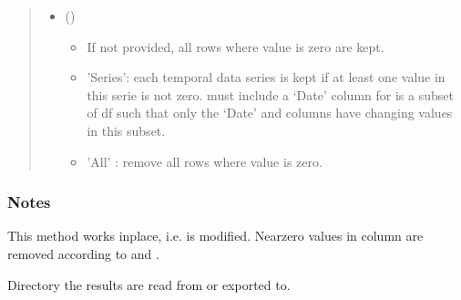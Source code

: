\documentclass[letterpaper,10pt,english]{sphinxmanual}
\begin{document}
\begin{fulllineitems}
\begin{fulllineitems}
\begin{quote}
\begin{description}
\begin{itemize}
\item {} 
\sphinxAtStartPar
{} (\sphinxstyleliteralemphasis{\sphinxupquote{, }}\sphinxstyleliteralemphasis{\sphinxupquote{, }}) \textendash{} \begin{itemize}
\item {} 
\sphinxAtStartPar
If not provided, all rows where  value is zero are kept.

\item {} 
\sphinxAtStartPar
’Series’: each temporal data series is kept if at least one value in this serie is not zero.
 must include a ‘Date’ column for  is a subset of df such that only the ‘Date’ and  columns
have changing values in this subset.

\item {} 
\sphinxAtStartPar
’All’ : remove all rows where  value is zero.

\end{itemize}


\end{itemize}

\end{description}\end{quote}
\subsubsection*{Notes}

\sphinxAtStartPar
This method works inplace, i.e.  is modified.
Near\sphinxhyphen{}zero values in column  are removed according to  and .

\end{fulllineitems}


\begin{fulllineitems}
\label{\detokenize{generated/tamos.data_IO.ResultsExport:tamos.data_IO.ResultsExport.working_dir}}
\pysigstartsignatures
{}
\pysigstopsignatures
\sphinxAtStartPar
Directory the results are read from or exported to.


\end{fulllineitems}
\end{fulllineitems}
\end{document}
